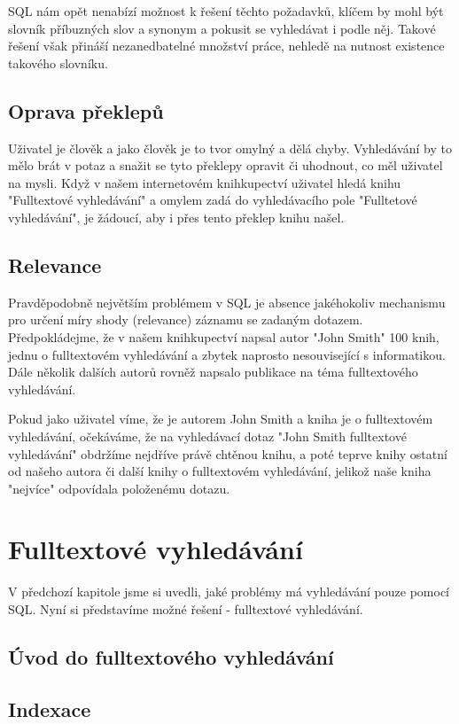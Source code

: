 \documentclass[11pt,draft,oneside]{fithesis2}
\begin{document}
SQL nám opět nenabízí možnost k řešení těchto požadavků, klíčem by mohl být slovník příbuzných slov a synonym a pokusit se vyhledávat i podle něj. Takové řešení však přináší nezanedbatelné množství práce, nehledě na nutnost existence takového slovníku.

\subsection{Oprava překlepů}
Uživatel je člověk a jako člověk je to tvor omylný a dělá chyby. Vyhledávání by to mělo brát v potaz a snažit se tyto překlepy opravit či uhodnout, co měl uživatel na mysli. Když v našem internetovém knihkupectví uživatel hledá knihu "Fulltextové vyhledávání" a
omylem zadá do vyhledávacího pole "Fulltetové vyhledávání", je žádoucí, aby i přes tento překlep knihu našel.

\subsection{Relevance}
Pravděpodobně největším problémem v SQL je absence jakéhokoliv mechanismu pro určení míry shody (relevance) záznamu se zadaným dotazem. Předpokládejme, že v našem knihkupectví napsal autor "John Smith" 100 knih, jednu o fulltextovém vyhledávání a 
zbytek naprosto nesouvisející s informatikou. Dále několik dalších autorů rovněž napsalo publikace na téma fulltextového vyhledávání.

Pokud jako uživatel víme, že je autorem John Smith a kniha je o fulltextovém vyhledávání, očekáváme, že na vyhledávací dotaz "John Smith fulltextové vyhledávání" obdržíme nejdříve právě chtěnou knihu, a poté teprve knihy ostatní od našeho autora či
další knihy o fulltextovém vyhledávání, jelikož naše kniha "nejvíce" odpovídala položenému dotazu.


\section{Fulltextové vyhledávání}
V předchozí kapitole jsme si uvedli, jaké problémy má vyhledávání pouze pomocí SQL. Nyní si představíme možné řešení - fulltextové vyhledávání. 

\subsection{Úvod do fulltextového vyhledávání}

\subsection{Indexace}
\end{document}
